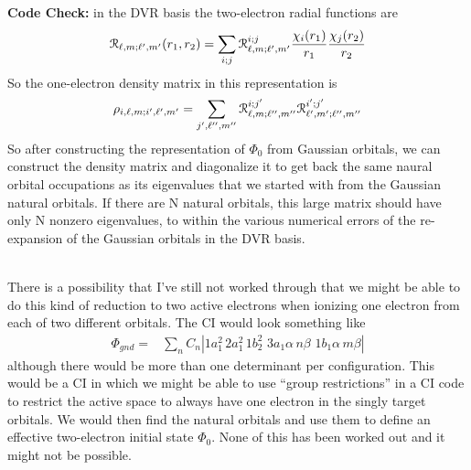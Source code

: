 \documentclass[%
pra%
,twocolumn%
,amssymb, nobibnotes, aps,
longbibliography
]{revtex4-1}
\begin{document}
\noindent \textbf{Code Check:}  in the DVR basis the two-electron radial functions are
\begin{equation}
\begin{split}
 \EuScript{R}_{\ell,m;\ell',m'} (r_1,r_2) = \sum_{i;j}  \EuScript{R}_{\ell,m;\ell',m'}^{i;j} \frac{\chi_i(r_1)}{r_1} \frac{ \chi_j(r_2) }{r_2}
\end{split}
\end{equation}
So the one-electron density matrix in this representation is
\begin{equation}
\begin{split}
\rho_{i,\ell,m;i',\ell',m'} = \sum_{j',\ell'',m''} \EuScript{R}_{\ell,m;\ell'',m''}^{i;j'}   \EuScript{R}_{\ell',m';\ell'',m''}^{i';j'} 
\end{split}
\end{equation}
So after constructing the representation of $\Phi_0$ from Gaussian orbitals, we can construct the density matrix and diagonalize it to get back the same naural orbital occupations as its eigenvalues that we started with from the Gaussian natural orbitals.  If there are N natural orbitals, this large matrix should have only N nonzero eigenvalues, to within the various numerical errors of the re-expansion of the Gaussian orbitals in the DVR basis.
\\
\

There is a possibility that I've still not worked through that we might be able to do this kind of reduction to two active electrons when ionizing one electron from each of two different orbitals.  The CI would look something like
\begin{equation}
\begin{split}
\Phi_{gnd}   =& \sum_{n} C_{n}  |1a_1^2 \,  2a_1^2 \, 1b_2^2 \,\, 3a_1\alpha  \, n\beta \,\, 1b_1 \alpha \, m\beta  |
\end{split}
\end{equation}
although there would be more than one determinant per configuration.  This would be a CI in which we might be able to use ``group restrictions'' in a CI code to restrict the active space to always have one electron in the singly target orbitals.  We would then find the natural orbitals and use them to define an effective two-electron initial state $\Phi_0$.  None of this has been worked out and it might not be possible.
\end{document}

